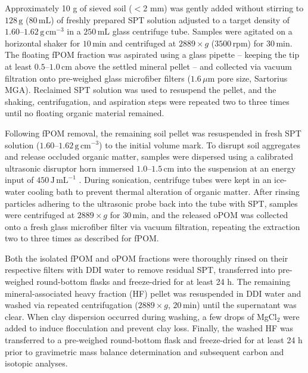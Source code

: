 \documentclass[preprint,12pt]{elsarticle}
\begin{document}
Approximately 10 g of sieved soil ($<$2 mm) was gently added without stirring to $128\,\text{g}$ ($80\,\text{mL}$) of freshly prepared SPT solution adjusted to a target density of $1.60\text{--}1.62\,\text{g}\,\text{cm}^{-3}$ in a $250\,\text{mL}$ glass centrifuge tube. Samples were agitated on a horizontal shaker for $10\,\text{min}$ and centrifuged at $2889 \times g$ ($3500\,\text{rpm}$) for $30\,\text{min}$. The floating fPOM fraction was aspirated using a glass pipette – keeping the tip at least $0.5\text{--}1.0\,\text{cm}$ above the settled mineral pellet – and collected via vacuum filtration onto pre-weighed glass microfiber filters ($1.6\,\mu\text{m}$ pore size, Sartorius MGA). Reclaimed SPT solution was used to resuspend the pellet, and the shaking, centrifugation, and aspiration steps were repeated two to three times until no floating organic material remained.

Following fPOM removal, the remaining soil pellet was resuspended in fresh SPT solution ($1.60\text{--}1.62\,\text{g}\,\text{cm}^{-3}$) to the initial volume mark. To disrupt soil aggregates and release occluded organic matter, samples were dispersed using a calibrated ultrasonic disruptor horn immersed $1.0\text{--}1.5\,\text{cm}$ into the suspension at an energy input of $450\,\text{J}\,\text{mL}^{-1}$ \citep{Crow2007, Guggenberger2013}. During sonication, centrifuge tubes were kept in an ice-water cooling bath to prevent thermal alteration of organic matter. After rinsing particles adhering to the ultrasonic probe back into the tube with SPT, samples were centrifuged at $2889 \times g$ for $30\,\text{min}$, and the released oPOM was collected onto a fresh glass microfiber filter via vacuum filtration, repeating the extraction two to three times as described for fPOM.

Both the isolated fPOM and oPOM fractions were thoroughly rinsed on their respective filters with DDI water to remove residual SPT, transferred into pre-weighed round-bottom flasks and freeze-dried for at least 24 h. The remaining mineral-associated heavy fraction (HF) pellet was resuspended in DDI water and washed via repeated centrifugation ($2889 \times g$, $20\,\text{min}$) until the supernatant was clear. When clay dispersion occurred during washing, a few drops of MgCl$_2$ were added to induce flocculation and prevent clay loss. Finally, the washed HF was transferred to a pre-weighed round-bottom flask and freeze-dried for at least 24 h prior to gravimetric mass balance determination and subsequent carbon and isotopic analyses.
\end{document}
